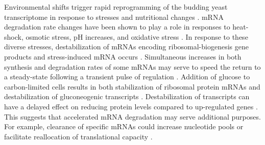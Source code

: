 Environmental shifts trigger rapid reprogramming of the budding yeast
transcriptome in response to stresses and nutritional
changes \parencite{gasch2000genomic,conway2012glucose}. mRNA degradation rate changes
have been shown to play a role in responses to heat-shock, osmotic
stress, pH increases, and oxidative stress
\parencite{castells2011heat,romero2009specific,canadell2015impact,molina2008comprehensive}. 
In response to these diverse stresses, 
destabilization of mRNAs encoding 
ribosomal-biogenesis gene products and  
stress-induced mRNA occurs \parencite{canadell2015impact}. 
Simultaneous increases in both synthesis and
degradation rates of some  mRNAs may serve to speed the return to a
steady-state following a transient pulse of regulation
\parencite{shalem2008transient}. Addition of glucose to carbon-limited cells 
results in both stabilization of 
ribosomal protein mRNAs \parencite{yin2003glucose} and destabilization
of gluconeogenic transcripts \parencite{de2002role,mercado1994levels}.
Destabilization of transcripts can
have a delayed effect on reducing protein levels compared to
up-regulated genes \parencite{lee2011dynamic}. This suggests that accelerated
mRNA degradation may serve additional purposes. For example, clearance
of specific mRNAs could increase nucleotide pools
\parencite{kresnowati2006transcriptome} or facilitate reallocation of
translational capacity 
\parencite{kief1981coordinate,giordano2016dynamical,shachrai2010cost}.

